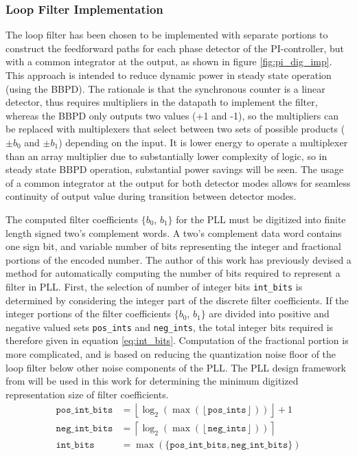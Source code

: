 

		\subsubsection{Loop Filter Implementation}
			The loop filter has been chosen to be implemented with separate portions to construct the feedforward paths for each phase detector of the PI-controller, but with a common integrator at the output, as shown in figure \ref{fig:pi_dig_imp}. This approach is intended to reduce dynamic power in steady state operation (using the BBPD). The rationale is that the synchronous counter is a linear detector, thus requires multipliers in the datapath to implement the filter, whereas the BBPD only outputs two values (+1 and -1), so the multipliers can be replaced with multiplexers that select between two sets of possible products ($\pm b_0$ and $\pm b_1$) depending on the input. It is lower energy to operate a multiplexer than an array multiplier due to substantially lower complexity of logic, so in steady state BBPD operation, substantial power savings will be seen. The usage of a common integrator at the output for both detector modes allows for seamless continuity of output value during transition between detector modes. 

			The computed filter coefficients $\{b_0$, $b_1\}$ for the PLL must be digitized into finite length signed two's complement words. A two's complement data word contains one sign bit, and variable number of bits representing the integer and fractional portions of the encoded number. The author of this work has previously devised a method \cite{Me} for automatically computing the number of bits required to represent a filter in PLL. First, the selection of number of integer bits \texttt{int\_bits} is determined by considering the integer part of the discrete filter coefficients. If the integer portions of the filter coefficients $\{b_0$, $b_1\}$ are divided into positive and negative valued sets \texttt{pos\_ints} and \texttt{neg\_ints}, the total integer bits required is therefore given in equation \ref{eq:int_bits}. Computation of the fractional portion is more complicated, and is based on reducing the quantization noise floor of the loop filter below other noise components of the PLL. The PLL design framework from \cite{Me} will be used in this work for determining the minimum digitized representation size of filter coefficients.
			\begin{align}
				\mathtt{pos\_int\_bits} &= \left\lfloor \log_2\left(\max\left(\left\lfloor \mathtt{pos\_ints} \right\rfloor\right)\right) \right\rfloor +1\\
				\mathtt{neg\_int\_bits} &= \left\lceil \log_2\left(\max\left(\left\lfloor \mathtt{neg\_ints} \right\rfloor\right)\right) \right\rceil\\
				\mathtt{int\_bits} &= \max(\mathtt{\{pos\_int\_bits}, \mathtt{neg\_int\_bits}\})\label{eq:int_bits}
			\end{align}


